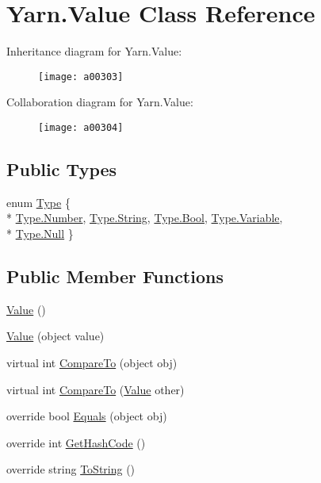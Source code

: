 \hypertarget{a00086}{\section{Yarn.\-Value Class Reference}
\label{a00086}
}


Inheritance diagram for Yarn.\-Value\-:
\nopagebreak
\begin{figure}[H]
\begin{center}
\leavevmode
\texttt{[image: a00303]}
\end{center}
\end{figure}


Collaboration diagram for Yarn.\-Value\-:
\nopagebreak
\begin{figure}[H]
\begin{center}
\leavevmode
\texttt{[image: a00304]}
\end{center}
\end{figure}
\subsection*{Public Types}
\begin{DoxyCompactItemize}
\item 
enum \hyperlink{a00086_ad5aaf60ee4504608fcc2ffadefa14884}{Type} \{ \\*
\hyperlink{a00086_ad5aaf60ee4504608fcc2ffadefa14884ab2ee912b91d69b435159c7c3f6df7f5f}{Type.\-Number}, 
\hyperlink{a00086_ad5aaf60ee4504608fcc2ffadefa14884a27118326006d3829667a400ad23d5d98}{Type.\-String}, 
\hyperlink{a00086_ad5aaf60ee4504608fcc2ffadefa14884ac26f15e86e3de4c398a8273272aba034}{Type.\-Bool}, 
\hyperlink{a00086_ad5aaf60ee4504608fcc2ffadefa14884a47c14840d8e15331fa420b9b2f757cd9}{Type.\-Variable}, 
\\*
\hyperlink{a00086_ad5aaf60ee4504608fcc2ffadefa14884abbb93ef26e3c101ff11cdd21cab08a94}{Type.\-Null}
 \}
\end{DoxyCompactItemize}
\subsection*{Public Member Functions}
\begin{DoxyCompactItemize}
\item 
\hyperlink{a00086_a7d2db75682c57463bf43c13499991ad4}{Value} ()
\item 
\hyperlink{a00086_a960a015e35ea66270fe2713f39490e09}{Value} (object value)
\item 
virtual int \hyperlink{a00086_abf4dccca577017dff90912c01024ff6a}{Compare\-To} (object obj)
\item 
virtual int \hyperlink{a00086_a66de8cb38561c6589f01ca667267f4c6}{Compare\-To} (\hyperlink{a00086}{Value} other)
\item 
override bool \hyperlink{a00086_a5f4e343c2a82ddca84008ac7d155071d}{Equals} (object obj)
\item 
override int \hyperlink{a00086_a4c8412105c2ed3058bddac30ecf49916}{Get\-Hash\-Code} ()
\item 
override string \hyperlink{a00086_a70460d2f12485c8b980d75ad178e180b}{To\-String} ()
\end{DoxyCompactItemize}
